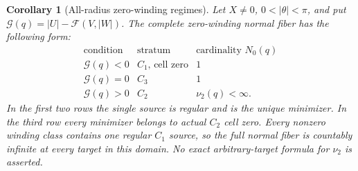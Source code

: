 \documentclass[11pt,a4paper]{article}
\newtheorem{corollary}[theorem]{Corollary}
\theoremstyle{remark}\newtheorem{remark}[theorem]{Remark}
\begin{document}
\begin{corollary}[All-radius zero-winding regimes]
\label{cor:zero-winding-regimes}
Let $X\ne0$, $0<|\theta|<\pi$, and put
$\mathcal G(q)=|U|-\mathcal F(V,|W|)$.
The complete zero-winding normal fiber has the following form:
\[
\begin{array}{c|c|c}
\text{condition}&\text{stratum}&\text{cardinality }N_0(q)\\ \hline
\mathcal G(q)<0&C_1\text{, cell zero}&1\\
\mathcal G(q)=0&C_3&1\\
\mathcal G(q)>0&C_2&\nu_2(q)<\infty.
\end{array}
\]
In the first two rows the single source is regular and is the unique
minimizer. In the third row every minimizer belongs to actual $C_2$
cell zero. Every nonzero winding class contains one regular $C_1$
source, so the full normal fiber is countably infinite at every target
in this domain. No exact arbitrary-target formula for $\nu_2$ is asserted.
\end{corollary}
\end{document}
